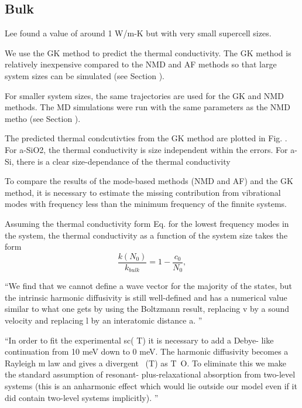 \documentclass[aps,prb,twocolumn,superscriptaddress,footinbib,amsmath,amssymb,floatfix]{revtex4}
\begin{document}
{\subsection{\label{S:Bulk}Bulk}

Lee found a value of around 1 W/m-K 
but with very small supercell sizes.\cite{lee_molecular-dynamics_1991}

We use the GK method to predict the thermal conductivity. The GK method 
is relatively inexpensive compared to the NMD and AF methods so that 
large system sizes 
can be simulated (see Section ).  

For smaller system sizes, the same trajectories are used for the GK and 
NMD methods. The MD simulations were run with the same parameters 
as the NMD metho (see Section ). 

The predicted thermal condcutivties from the GK method are plotted 
in Fig. . For a-SiO2, the thermal conductivity is size independent 
within the errors.  For a-Si, there is a clear size-dependance of the 
thermal conductivity

To compare the results of the mode-based methods (NMD and AF) and 
the GK method, it is necessary to estimate the missing contribution from 
vibrational modes with frequency less than the minimum frequency of 
the finnite systems. 

Assuming the thermal conductivity form Eq.  for the lowest frequency modes in 
the system, the thermal conductivity as a function of the system size 
takes the form
\begin{equation}\label{EQ:k0}
\frac{k(N_0)}{k_{bulk}} = 1 - \frac{c_0}{N_0},
\end{equation}

``We find that we cannot define a wave vector for the
majority of the states, but the intrinsic harmonic diffusivity is still well-defined and has a numerical value
similar to what one gets by using the Boltzmann result, replacing v by a sound velocity and replacing l by
an interatomic distance a.
''\cite{feldman_thermal_1993}

``In order to fit the experimental sc( T) it is necessary to add a Debye-
like continuation from 10 meV down to 0 meV. The harmonic diffusivity becomes a Rayleigh m
law
and gives a divergent ~(T) as T~O. To eliminate this we make the standard assumption of resonant-
plus-relaxational absorption from two-level systems (this is an anharmonic effect which would lie outside
our model even if it did contain two-level systems implicitly).
''\cite{feldman_thermal_1993}



}
\end{document}

